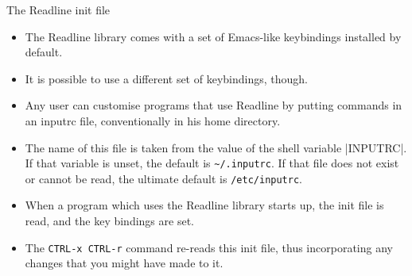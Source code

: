 \begin{frame}{The Readline init file}
    \begin{itemize}
        \setlength{\itemsep}{2mm}
        \item The Readline library comes with a set of Emacs-like keybindings installed by default.
        \item It is possible to use a different set of keybindings, though.
        \item Any user can customise programs that use Readline by putting commands in an inputrc file, conventionally in his home directory.
        \item The name of this file is taken from the value of the shell variable \bash|INPUTRC|.
              If that variable is unset, the default is \texttt{\textasciitilde/.inputrc}.
              If that file does not exist or cannot be read, the ultimate default is \texttt{/etc/inputrc}.
        \item When a program which uses the Readline library starts up, the init file is read, and the key bindings are set.
        \item The \texttt{CTRL-x CTRL-r} command re-reads this init file, thus incorporating any changes that you might have made to it.
    \end{itemize}
\end{frame}
